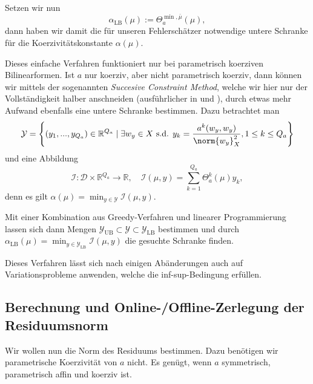 Setzen wir nun
\begin{equation}
    \alpha_\text{LB}(\mu) := \Theta_a^{\min, \bar \mu}(\mu),
\end{equation}
dann haben wir damit die für unseren Fehlerschätzer notwendige untere Schranke für die Koerzivitätskonstante $\alpha(\mu)$.

Dieses einfache Verfahren funktioniert nur bei parametrisch koerziven Bilinearformen. Ist $a$ nur koerziv, aber nicht parametrisch koerziv, dann können wir mittels der sogenannten \emph{Succesive Constraint Method}, welche wir hier nur der Vollständigkeit halber anschneiden (ausführlicher in \cite{Stamm} und \cite{huynh2007successive}), durch etwas mehr Aufwand ebenfalls eine untere Schranke bestimmen. Dazu betrachtet man
\begin{equation}
    \mathcal Y = \left\{ (y_1, ..., y_{Q_a}) \in \mathbb{R}^{Q_a} \mid \exists w_y \in X \text{ s.d. } y_k = \frac{a^k(w_y, w_y)}{\norm{w_y}^2_X}, 1 \leq k \leq Q_a \right\}
\end{equation}
und eine Abbildung
\begin{equation}
    \mathcal I \colon \mathcal D \times \mathbb{R}^{Q_a} \to \mathbb{R}, \quad \mathcal I(\mu, y) = \sum_{k=1}^{Q_a} \Theta^k_a(\mu) y_k,
\end{equation}
 denn es gilt $\alpha(\mu) = \min_{y \in \mathcal Y} \mathcal I(\mu, y)$.

Mit einer Kombination aus Greedy-Verfahren und linearer Programmierung lassen sich dann Mengen $\mathcal Y_\text{UB} \subset \mathcal Y \subset \mathcal Y_\text{LB}$ bestimmen und durch $\alpha_\text{LB}(\mu) = \min_{y \in \mathcal Y_\text{LB}} \mathcal I(\mu, y)$ die gesuchte Schranke finden.

Dieses Verfahren lässt sich nach einigen Abänderungen auch auf Variationsprobleme anwenden, welche die inf-sup-Bedingung erfüllen.


\subsection{Berechnung und Online-/Offline-Zerlegung der Residuumsnorm} %
\label{sub:online_offline_zerlegung_von_norm}

Wir wollen nun die Norm des Residuums bestimmen.
Dazu benötigen wir parametrische Koerzivität von $a$ nicht.
Es genügt, wenn $a$ symmetrisch, parametrisch affin und koerziv ist.

